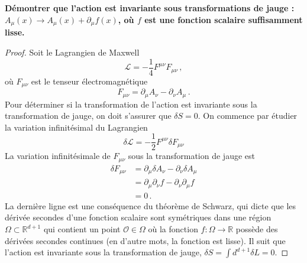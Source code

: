 \documentclass{article}
\numberwithin{equation}{section}
\theoremstyle{solution}
\begin{document}
\subsection{}
\textbf{Démontrer que l’action est invariante sous transformations de jauge : $A_{\mu}(x) \rightarrow A_{\mu}(x) +
\partial_{\mu}f(x)$, où $f$ est une fonction scalaire suffisamment lisse.}
\vspace{2ex}

\begin{proof}
Soit le Lagrangien de Maxwell
\begin{equation}
        \mathcal{L} = -\frac{1}{4}F^{\mu \nu}F_{\mu\nu}\, , %
\end{equation} 
où $F_{\mu\nu}$ est le tenseur électromagnétique %
\begin{equation}\label{eq:F}
        F_{\mu\nu} = \partial_{\mu}A_\nu - \partial_{\nu}A_\mu\, .
\end{equation} 
Pour déterminer si la transformation de l'action est invariante sous la transformation de jauge, on doit s'assurer que $\delta S = 0$.
On commence par étudier la variation infinitésimal du Lagrangien
\begin{equation}
        \delta \mathcal{L} = -\frac{1}{2}F^{\mu \nu} \delta F_{\mu \nu}
\end{equation} 
La variation infinitésimale de $F_{\mu \nu}$ sous la transformation de jauge est
\begin{align*}
        \delta F_{\mu \nu} &= \partial_{\mu}\delta A_{\nu} - \partial_{\nu} \delta A_\mu \\
        &= \partial_{\mu}\partial_\nu f - \partial_{\nu} \partial_\mu f \\
        &= 0\, .
\end{align*}
La dernière ligne est une conséquence du théorème de Schwarz, qui dicte que les dérivée secondes d'une fonction scalaire sont symétriques dans une région $\Omega \subset \mathbb{R}^{d+1}$ qui 
contient un point $\mathcal{O} \in \Omega$ où la fonction $f:\Omega \rightarrow \mathbb{R}$ possède des dérivées secondes continues (en d'autre mots, la fonction est lisse). 
Il suit que l'action est invariante sous la transformation de jauge, 
$\delta S = \int d^{d+1} \delta L = 0$.
\end{proof}
\end{document}
